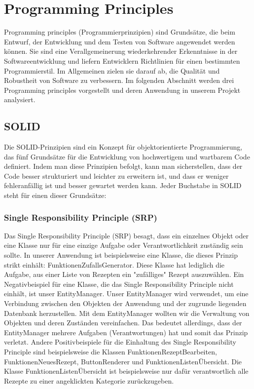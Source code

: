 \chapter{Programming Principles}
Programming principles (Programmierprinzipien) sind Grundsätze, die beim Entwurf, der Entwicklung und dem Testen von Software angewendet werden können. Sie sind eine Verallgemeinerung wiederkehrender Erkenntnisse in der Softwareentwicklung und liefern Entwicklern Richtlinien für einen bestimmten Programmierstil.
Im Allgemeinen zielen sie darauf ab, die Qualität und Robustheit von Software zu verbessern. Im folgenden Abschnitt werden drei Programming principles vorgestellt und deren Anwendung in unserem Projekt analysiert. 
\section{SOLID}
Die SOLID-Prinzipien sind ein Konzept für objektorientierte Programmierung, das fünf Grundsätze für die Entwicklung von hochwertigem und wartbarem Code definiert. Indem man diese Prinzipien befolgt, kann man sicherstellen, dass der Code besser strukturiert und leichter zu erweitern ist, und dass er weniger fehleranfällig ist und besser gewartet werden kann. Jeder Buchstabe in SOLID steht für einen dieser Grundsätze:
\subsection{Single Responsibility Principle (SRP)}
Das Single Responsibility Principle (SRP) besagt, dass ein einzelnes Objekt oder eine Klasse nur für eine einzige Aufgabe oder Verantwortlichkeit zuständig sein  sollte.
In unserer Anwendung ist beispielsweise eine Klasse, die dieses Prinzip strikt einhält: FunktionenZufallsGenerator. Diese Klasse hat lediglich die Aufgabe, aus einer Liste von Rezepten ein "zufälliges" Rezept auszuwählen. 
Ein Negativbeispiel für eine Klasse, die das Single Responsibility Principle nicht einhält, ist unser EntityManager. Unser EntityManager wird verwendet, um eine Verbindung zwischen den Objekten der Anwendung und der zugrunde liegenden Datenbank herzustellen. Mit dem EntityManager wollten wir die Verwaltung von Objekten und deren Zuständen vereinfachen. Das bedeutet allerdings, dass der EntityManager mehrere Aufgaben (Verantwortungen) hat und somit das Prinzip verletzt. 
Andere Positivbeispiele für die Einhaltung des Single Responsibility Principle sind beispielsweise die Klassen FunktionenRezeptBearbeiten, FunktionenNeuesRezept, ButtonRenderer und FunktionenListenÜbersicht. Die Klasse FunktionenListenÜbersicht ist beispielsweise nur dafür verantwortlich alle Rezepte zu einer angeklickten Kategorie zurückzugeben. 